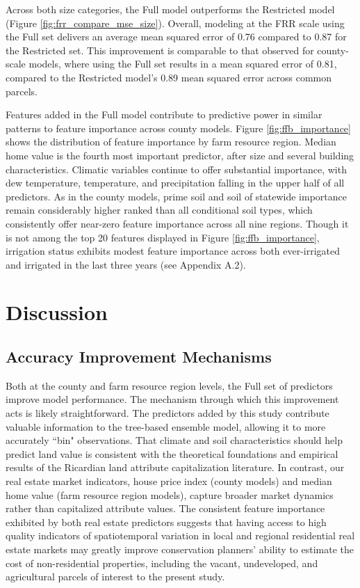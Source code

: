 \documentclass[12pt]{article}
\begin{document}
Across both size categories, the Full model outperforms the Restricted model (Figure \ref{fig:frr_compare_mse_size}). Overall, modeling at the FRR scale using the Full set delivers an average mean squared error of 0.76 compared to 0.87 for the Restricted set. This improvement is comparable to that observed for county-scale models, where using the Full set results in a mean squared error of 0.81, compared to the Restricted model's 0.89 mean squared error across common parcels.

Features added in the Full model contribute to predictive power in similar patterns to feature importance across county models. Figure \ref{fig:ffb_importance} shows the distribution of feature importance by farm resource region. Median home value is the fourth most important predictor, after size and several building characteristics. Climatic variables continue to offer substantial importance, with dew temperature, temperature, and precipitation falling in the upper half of all predictors. As in the county models, prime soil and soil of statewide importance remain considerably higher ranked than all conditional soil types, which consistently offer near-zero feature importance across all nine regions. Though it is not among the top 20 features displayed in Figure \ref{fig:ffb_importance}, irrigation status exhibits modest feature importance across both ever-irrigated and irrigated in the last three years (see Appendix A.2).


\section{Discussion}

\subsection{Accuracy Improvement Mechanisms}

Both at the county and farm resource region levels, the Full set of predictors improve model performance. The mechanism through which this improvement acts is likely straightforward. The predictors added by this study contribute valuable information to the tree-based ensemble model, allowing it to more accurately ``bin" observations. That climate and soil characteristics should help predict land value is consistent with the theoretical foundations and empirical results of the Ricardian land attribute capitalization literature. In contrast, our real estate market indicators, house price index (county models) and median home value (farm resource region models), capture broader market dynamics rather than capitalized attribute values. The consistent feature importance exhibited by both real estate predictors suggests that having access to high quality indicators of spatiotemporal variation in local and regional residential real estate markets may greatly improve conservation planners' ability to estimate the cost of non-residential properties, including the vacant, undeveloped, and agricultural parcels of interest to the present study.
\end{document}
